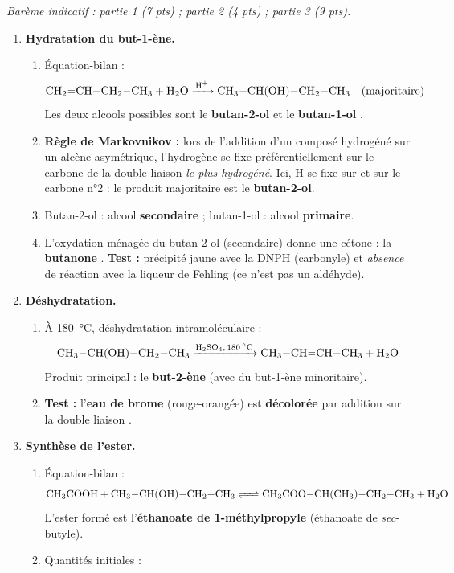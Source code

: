 \documentclass[11pt]{article}
\newcommand{\cle}[1]{{\popxbold\color{popdark}#1}}
\begin{document}
\begin{corrige}
\emph{Barème indicatif : partie 1 (7 pts) ; partie 2 (4 pts) ; partie 3 (9 pts).}

\begin{enumerate}
\item \textbf{Hydratation du but-1-ène.}
\begin{enumerate}
\item Équation-bilan :
\[ \ce{CH2=CH-CH2-CH3 + H2O ->[H+] CH3-CH(OH)-CH2-CH3} \quad \text{(majoritaire)} \]
Les deux alcools possibles sont le \textbf{butan-2-ol} et le \textbf{butan-1-ol} .
\item \textbf{Règle de Markovnikov :} lors de l'addition d'un composé hydrogéné sur un alcène asymétrique, l'hydrogène se fixe préférentiellement sur le carbone de la double liaison \emph{le plus hydrogéné}. Ici, H se fixe sur  et  sur le carbone n°2 : le produit majoritaire est le \textbf{butan-2-ol}.
\item Butan-2-ol : alcool \textbf{secondaire} ; butan-1-ol : alcool \textbf{primaire}.
\item L'oxydation ménagée du butan-2-ol (secondaire) donne une \cle{cétone} : la \textbf{butanone} . \textbf{Test :} précipité jaune avec la DNPH (carbonyle) et \emph{absence} de réaction avec la liqueur de Fehling (ce n'est pas un aldéhyde).
\end{enumerate}
\item \textbf{Déshydratation.}
\begin{enumerate}
\item À \SI{180}{\celsius}, déshydratation intramoléculaire :
\[ \ce{CH3-CH(OH)-CH2-CH3 ->[H2SO4, \SI{180}{\celsius}] CH3-CH=CH-CH3 + H2O} \]
Produit principal : le \textbf{but-2-ène} (avec du but-1-ène minoritaire).
\item \textbf{Test :} l'\textbf{eau de brome} (rouge-orangée) est \textbf{décolorée} par addition sur la double liaison .
\end{enumerate}
\item \textbf{Synthèse de l'ester.}
\begin{enumerate}
\item Équation-bilan :
\[ \ce{CH3COOH + CH3-CH(OH)-CH2-CH3 <=> CH3COO-CH(CH3)-CH2-CH3 + H2O} \]
L'ester formé est l'\textbf{éthanoate de 1-méthylpropyle} (éthanoate de \emph{sec}-butyle).
\item Quantités initiales :

\end{enumerate}
\end{enumerate}
\end{corrige}
\end{document}

